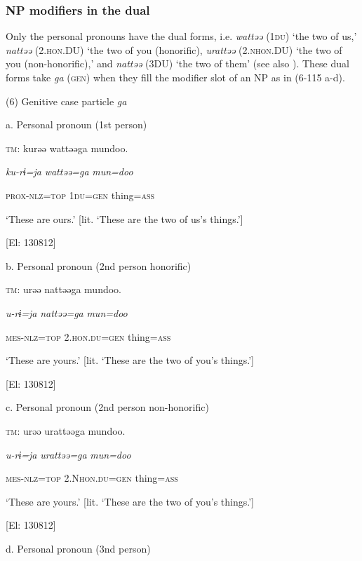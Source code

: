 \subsubsection{NP modifiers in the dual}

Only the personal pronouns have the dual forms, i.e. \textit{wattəə} (1\textsc{du}) ‘the two of us,’ \textit{nattəə} (2.\textsc{hon}.DU) ‘the two of you (honorific), \textit{urattəə} (2.\textsc{nhon}.DU) ‘the two of you (non-honorific),’ and \textit{nattəə} (3DU) ‘the two of them’ (see also ). These dual forms take \textit{ga} (\textsc{gen}) when they fill the modifier slot of an NP as in (6-115 a-d).

(6)  Genitive case particle \textit{ga}

  a.  Personal pronoun (1st person)

    \textsc{tm}:  kurəə  wattəəga  mundoo.

      \textit{ku-rɨ=ja}  \textit{wattəə=ga}  \textit{mun=doo}

      \textsc{prox}-\textsc{nlz}=\textsc{top}  1\textsc{du}=\textsc{gen}  thing=\textsc{ass}

      ‘These are ours.’ [lit. ‘These are the two of us’s things.’]

      [El: 130812]

  b.  Personal pronoun (2nd person honorific)

    \textsc{tm}:  urəə  nattəəga  mundoo.

      \textit{u-rɨ=ja}  \textit{nattəə=ga}  \textit{mun=doo}

      \textsc{mes}-\textsc{nlz}=\textsc{top}  2.\textsc{hon}.\textsc{du}=\textsc{gen}  thing=\textsc{ass}

      ‘These are yours.’ [lit. ‘These are the two of you’s things.’]

      [El: 130812]

  c.  Personal pronoun (2nd person non-honorific)

    \textsc{tm}:  urəə  urattəəga  mundoo.

      \textit{u-rɨ=ja}  \textit{urattəə=ga}  \textit{mun=doo}

      \textsc{mes}-\textsc{nlz}=\textsc{top}  2.N\textsc{hon}.\textsc{du}=\textsc{gen}  thing=\textsc{ass}

      ‘These are yours.’ [lit. ‘These are the two of you’s things.’]

      [El: 130812]

  d.  Personal pronoun (3nd person)

